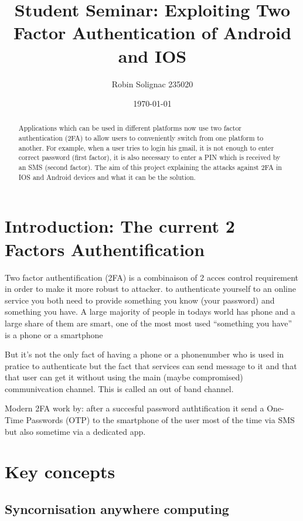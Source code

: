 \documentclass[11pt]{article}
\title{Student Seminar: Exploiting Two Factor Authentication of Android and IOS}
\author{Robin Solignac 235020}
\date{\today}
\begin{document}
\maketitle
\begin{abstract}
Applications  which  can  be  used  in  different  platforms  now  use  two
factor authentication (2FA) to allow users to conveniently switch from one platform to another.
For example, when a user tries to login his gmail, it is not enough to enter correct password (first
factor), it is also necessary to enter a PIN which is received by an SMS (second factor).  The aim
of this project explaining the attacks against 2FA in IOS and Android devices and what it can
be the solution. 
\end{abstract}

\section{Introduction: The current 2 Factors Authentification}

Two factor authentification (2FA) is a combinaison of 2 acces control requirement in 
order to make it more robust to attacker. to authenticate yourself to an online 
service you both need to provide something you know (your password) and 
something you have. 
A large majority of people in todays world has phone and a large share of 
them are smart, one of the most most used ``something you have''  is a phone or 
a smartphone

But it's not the only fact of having a phone or a phonenumber who is 
used in pratice to authenticate but the fact that services can send message to it and that that 
user can get it without using the main (maybe compromised) communivcation 
channel. This is called an out of band channel. 

Modern 2FA work by: after a succesful password authtification it send a One-
Time Passwords (OTP) to the smartphone of the user most of the time via SMS 
but also sometime via a dedicated app.

\section{Key concepts}
\subsection{Syncornisation anywhere computing}
\end{document}
